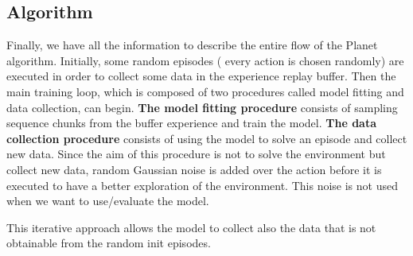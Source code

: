 \subsection{Algorithm}
Finally, we have all the information to describe the entire flow of the Planet algorithm.
Initially, some random episodes ( every action is chosen randomly) are executed in order to collect some data in the experience replay buffer.
Then the main training loop, which is composed of two procedures called model fitting and data collection, can begin.
\textbf{The model fitting procedure} consists of sampling sequence chunks from the buffer experience and train the model.
\textbf{The data collection procedure} consists of using the model to solve an episode and collect new data. 
Since the aim of this procedure is not to solve the environment but collect new data, random Gaussian noise is added over the action before it is executed to have a better exploration of the environment.
This noise is not used when we want to use/evaluate the model.





This iterative approach allows the model to collect also the data that is not obtainable from the random init episodes.



